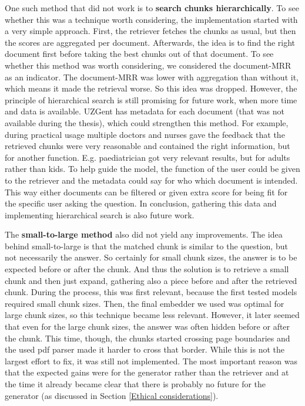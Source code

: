One such method that did not work is to \textbf{search chunks hierarchically}. To see whether this was a technique worth considering, the implementation started with a very simple approach. First, the retriever fetches the chunks as usual, but then the scores are aggregated per document. Afterwards, the idea is to find the right document first before taking the best chunks out of that document. To see whether this method was worth considering, we considered the document-MRR as an indicator. The document-MRR was lower with aggregation than without it, which means it made the retrieval worse. So this idea was dropped. However, the principle of hierarchical search is still promising for future work, when more time and data is available. UZGent has metadata for each document (that was not available during the thesis), which could strengthen this method. For example, during practical usage multiple doctors and nurses gave the feedback that the retrieved chunks were very reasonable and contained the right information, but for another function. E.g. paediatrician got very relevant results, but for adults rather than kids. To help guide the model, the function of the user could be given to the retriever and the metadata could say for who which document is intended. This way either documents can be filtered or given extra score for being fit for the specific user asking the question. In conclusion, gathering this data and implementing hierarchical search is also future work.

The \textbf{small-to-large method} also did not yield any improvements. The idea behind small-to-large is that the matched chunk is similar to the question, but not necessarily the answer. So certainly for small chunk sizes, the answer is to be expected before or after the chunk. And thus the solution is to retrieve a small chunk and then just expand, gathering also a piece before and after the retrieved chunk. During the process, this was first relevant, because the first tested models required small chunk sizes. Then, the final embedder we used was optimal for large chunk sizes, so this technique became less relevant. However, it later seemed that even for the large chunk sizes, the answer was often hidden before or after the chunk. This time, though, the chunks started crossing page boundaries and the used pdf parser made it harder to cross that border. While this is not the largest effort to fix, it was still not implemented. The most important reason was that the expected gains were for the generator rather than the retriever and at the time it already became clear that there is probably no future for the generator (as discussed in Section \ref{Ethical considerations}).

